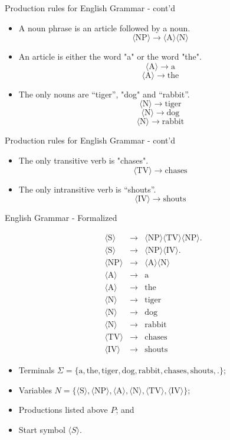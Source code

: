 \documentclass{beamer}
\newcommand{\nt}[1]{{\langle \mbox{#1}\rangle}}
\def\pspace{\vspace{\fill}}
\newcommand*{\englishgrammar} {\begin{array}{rcl}
      \nt{S} &\rightarrow &  \nt{NP} \nt{TV} \nt{NP} . \\
      \nt{S} &\rightarrow &  \nt{NP} \nt{IV} . \\
      \nt{NP}  &\rightarrow & \nt{A} \nt{N}\\
      \nt{A}   &\rightarrow & \textrm{a}\\
      \nt{A}   &\rightarrow & \textrm{the}\\
      \nt{N}   &\rightarrow & \textrm{tiger}\\
      \nt{N}   &\rightarrow & \textrm{dog}\\
      \nt{N}   &\rightarrow & \textrm{rabbit}\\
      \nt{TV}   &\rightarrow & \textrm{chases}\\
      \nt{IV}   &\rightarrow & \textrm{shouts}
\end{array}}
\begin{document}
\begin{frame}{Production rules for English Grammar - cont'd}

\pspace

\begin{itemize}
\item A noun phrase is an article followed by a noun. \pause
\[\nt{NP} \rightarrow \nt{A}\nt{N}\] \pause
\item An article is either the word "a" or the word "the". \pause
\[ \nt{A}   \rightarrow  \textrm{a}
\]
\[   \nt{A}   \rightarrow  \textrm{the}
\] \pause
\item The only nouns are  ``tiger'', "dog" and ``rabbit''. \pause
\[ \nt{N}   \rightarrow  \textrm{tiger}
\]
\[ \nt{N}   \rightarrow  \textrm{dog}
\]
\[\nt{N}   \rightarrow  \textrm{rabbit}
\]
\end{itemize}

\pspace

\end{frame}

\begin{frame}{Production rules for English Grammar - cont'd}

\pspace

\begin{itemize}
\item The only transitive verb is "chases". \pause
\[ \nt{TV}   \rightarrow  \textrm{chases}
\]
\item The only intransitive verb is  ``shouts''. \pause
\[ \nt{IV}   \rightarrow  \textrm{shouts}
\]
\end{itemize}

\pspace

\end{frame}

\begin{frame}{English Grammar - Formalized}

\[\englishgrammar\]

\pspace

\begin{itemize}
\item Terminals $\Sigma=\{\textrm{a}, \textrm{the}, \textrm{tiger}, \textrm{dog}, \textrm{rabbit}, \textrm{chases}, \textrm{shouts},   .\}$;
\item Variables $N=\{\nt{S}, \nt{NP}, \nt{A}, \nt{N}, \nt{TV}, \nt{IV}  \}$;
\item Productions listed above $P$; and
\item Start symbol $\langle S \rangle$.
\end{itemize}


\end{frame}
\end{document}
